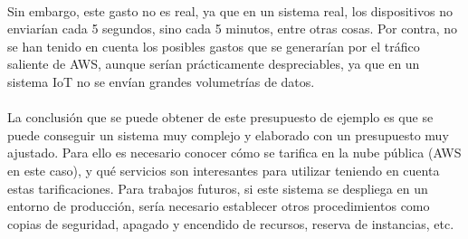 \documentclass[../../memoria.tex]{subfiles}
\begin{document}
\paragraph{}
Sin embargo, este gasto no es real, ya que en un sistema real, los dispositivos no enviarían cada 5 segundos, sino cada 5 minutos, entre otras cosas. Por contra, no se han tenido en cuenta los posibles gastos que se generarían por el tráfico saliente de AWS, aunque serían prácticamente despreciables, ya que en un sistema IoT no se envían grandes volumetrías de datos.

\paragraph{}
La conclusión que se puede obtener de este presupuesto de ejemplo es que se puede conseguir un sistema muy complejo y elaborado con un presupuesto muy ajustado. Para ello es necesario conocer cómo se tarifica en la nube pública (AWS en este caso), y qué servicios son interesantes para utilizar teniendo en cuenta estas tarificaciones. Para trabajos futuros, si este sistema se despliega en un entorno de producción, sería necesario establecer otros procedimientos como copias de seguridad, apagado y encendido de recursos, reserva de instancias, etc.
\end{document}
